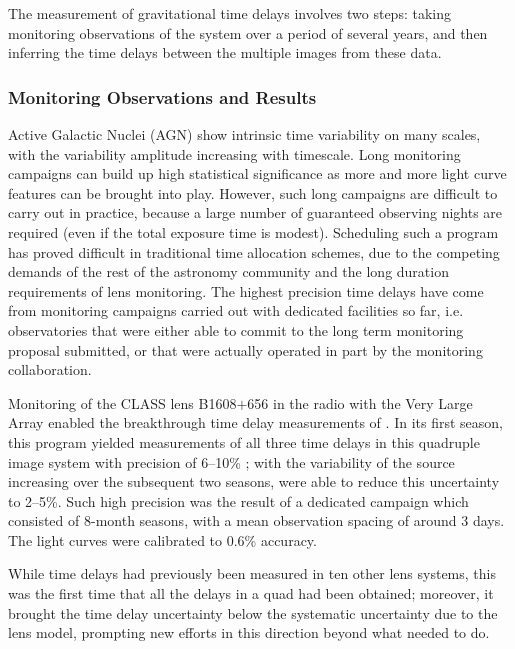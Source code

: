The measurement of gravitational time delays involves two steps:  taking
monitoring observations of the system over a period of several years,
and then inferring the time delays between the multiple images from
these data.


\subsubsection{Monitoring Observations and Results}

Active Galactic Nuclei (AGN) show intrinsic time variability on many
scales, with the variability amplitude increasing with timescale. Long
monitoring campaigns can build up high statistical significance as
more and more light curve features can be brought into play.  However,
such long campaigns are difficult to carry out in practice, because a
large number of guaranteed observing nights are required (even if the
total exposure time is modest). Scheduling such a program has proved
difficult in traditional time allocation schemes, due to the competing
demands of the rest of the astronomy community and the long duration
requirements of lens monitoring. The highest precision time delays
have come from monitoring campaigns carried out with dedicated
facilities so far, i.e. observatories that were either able to commit
to the long term monitoring proposal submitted, or that were actually
operated in part by the monitoring collaboration.


Monitoring of the CLASS lens B1608$+$656 in the radio with the Very
Large Array enabled the breakthrough  time delay measurements of
\citep{Fas++02}. In its first season, this program  yielded measurements
of all three time delays in this quadruple image system with precision
of 6--10\% \citep{Fas++99}; with the variability of the source
increasing over the subsequent two seasons, \citep{Fas++02} were able
to reduce this uncertainty to 2--5\%. Such high precision was the
result of a dedicated campaign which consisted of 8-month seasons,
with a mean observation spacing of around 3 days. The light curves
were calibrated to 0.6\% accuracy.

While time delays had previously been measured in ten other lens
systems, this was the first time that all the delays in a quad had
been obtained; moreover, it brought the time delay uncertainty below
the systematic uncertainty due to the lens model, prompting new
efforts in this direction beyond what \citet{K+F99} needed to do.

